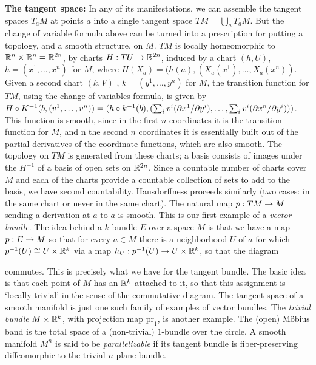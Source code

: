 {\bf The tangent space:} In any of its manifestations, we can assemble the tangent spaces
$T_aM$ at points $a$ into a single tangent space $TM=\bigcup_aT_aM$. But the change of 
variable formula above can be turned into a prescription for putting a topology, and
a smooth structure, on $M$. $TM$ is locally homeomorphic to ${\Bbb R}^n\times {\Bbb R}^n={\Bbb R}^{2n}$,
by charts $H:TU\rightarrow {\Bbb R}^{2n}$, induced by a chart $(h,U)$, $h=(x^1,\ldots ,x^n)$ for $M$, where
$H(X_a)=(h(a),(X_a(x^1),\ldots ,X_a(x^n))$. Given a second chart $(k,V)$ , $k=(y^1,\ldots ,y^n)$
for $M$, the transition function for $TM$, using the change of variables formula, is given by
$H\circ K^{-1}(b,(v^1,\ldots ,v^n))=
(h\circ k^{-1}(b),(\sum_i v^i(\partial x^1/\partial y^i),\ldots ,\sum_iv^i(\partial x^n/\partial y^i)))$.
This function is smooth, since in the first $n$ coordinates it is the transition function
for $M$, and n the second $n$ coordinates it is essentially built out of the partial
derivatives of the coordinate functions, which are also smooth. The topology on $TM$
is generated from these charts; a basis consists of images under the $H^{-1}$ of a basis
of open sets on ${\Bbb R}^{2n}$. Since a countable number of charts cover $M$ and each of
the charts provide a countable collection of sets to add to the basis, we have second
countability. Hausdorffness proceeds similarly (two cases: in the same chart or never in
the same chart). The natural map $p:TM\rightarrow M$ sending a derivation at $a$ to $a$ is smooth.
This is our first example of a {\it vector bundle}. The idea behind a $k$-bundle $E$ over
a space $M$ is that 
we have a map $p:E\rightarrow M$ so that for every $a\in M$ there is a neighborhood $U$ of $a$
for which $p^{-1}(U)\cong U\times {\Bbb R}^k$ via a map $h_U:p^{-1}(U)\rightarrow U\times {\Bbb R}^k$, so that
the diagram 

\ssk


\ssk

\noindent commutes. This is precisely what we have for the tangent bundle. The basic idea is
that each point of $M$ has an ${\Bbb R}^k$ attached to it, so that this assignment is
`locally trivial' in the sense of the commutative diagram. The tangent space of a smooth manifold
is just one such family of examples of vector bundles. The {\it trivial bundle}
$M\times {\Bbb R}^k$, with projection map $\text{pr}_1$, is another example. The (open)
M\"obius band is the total space of a (non-trivial) $1$-bundle over the circle.
A smooth manifold $M^n$ is said to be {\it parallelizable} if its tangent bundle is 
fiber-preserving diffeomorphic to the trivial $n$-plane bundle. 

